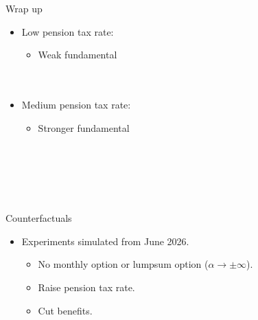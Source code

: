 \documentclass[11pt, aspectratio=169]{beamer}
\begin{document}
\begin{frame}{Wrap up}
    \begin{itemize}[<+->]
        \item Low pension tax rate: 
        \begin{itemize}[<+->]
            \item[-] Weak fundamental \\
             \\
             \\
        \end{itemize}
        \item Medium pension tax rate: 
        \begin{itemize}[<+->]
            \item[-] Stronger fundamental \\
             \\
             \\
             \\
             \\ 
             \\ 
        \end{itemize}
    \end{itemize}
\end{frame}

\begin{frame}{Counterfactuals}
    \begin{itemize}
        \item Experiments simulated from June 2026.
        \begin{itemize}[<+->]
            \item[-] No monthly option or lumpsum option ($\alpha\to\pm\infty$).
            \item[-] Raise pension tax rate.
            \item[-] Cut benefits.
        \end{itemize}
    \end{itemize}
\end{frame}
\end{document}
